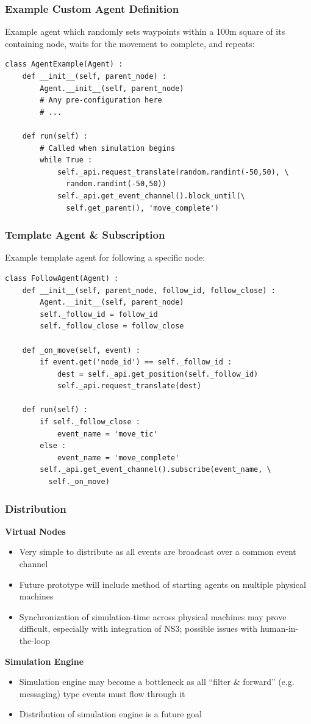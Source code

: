 \documentclass[mathserif]{beamer}
\begin{document}
\begin{frame}[fragile]
    \frametitle{Example Custom Agent Definition}
    Example agent which randomly sets waypoints within a 100m square of its containing node, waits for the movement to complete, and repeats:
    {\tiny
    \begin{verbatim}
class AgentExample(Agent) :
    def __init__(self, parent_node) :
        Agent.__init__(self, parent_node)
        # Any pre-configuration here
        # ...

    def run(self) :
        # Called when simulation begins
        while True :
            self._api.request_translate(random.randint(-50,50), \ 
              random.randint(-50,50))
            self._api.get_event_channel().block_until(\
              self.get_parent(), 'move_complete')
    \end{verbatim}}
\end{frame}

\begin{frame}[fragile]
    \frametitle{Template Agent \& Subscription}
    Example template agent for following a specific node:
    {\tiny
    \begin{verbatim}
class FollowAgent(Agent) :
    def __init__(self, parent_node, follow_id, follow_close) :
        Agent.__init__(self, parent_node)
        self._follow_id = follow_id
        self._follow_close = follow_close

    def _on_move(self, event) :
        if event.get('node_id') == self._follow_id :
            dest = self._api.get_position(self._follow_id)
            self._api.request_translate(dest)

    def run(self) :
        if self._follow_close :
            event_name = 'move_tic'
        else :
            event_name = 'move_complete'
        self._api.get_event_channel().subscribe(event_name, \
          self._on_move)
    \end{verbatim}}
\end{frame}

\frame
{
    \frametitle{Distribution}
    \textbf{Virtual Nodes}
    \begin{itemize}
	\item Very simple to distribute as all events are broadcast over a common event channel
	\item Future prototype will include method of starting agents on multiple physical machines
	\item Synchronization of simulation-time across physical machines may prove difficult, especially with integration of NS3; possible issues with human-in-the-loop
    \end{itemize}
    \textbf{Simulation Engine}
    \begin{itemize}
	\item Simulation engine may become a bottleneck as all ``filter \& forward'' (e.g. messaging) type events must flow through it
	\item Distribution of simulation engine is a future goal 
    \end{itemize}
}
\end{document}
